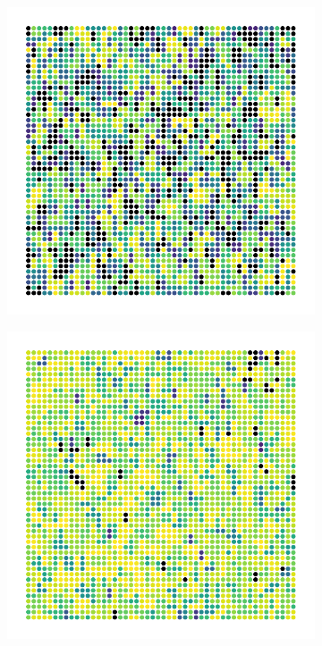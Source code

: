 \documentclass[twoside,10pt]{article}
\begin{document}
\begin{figure}[H]
        \centering
        \begin{subfigure}
                \centering
                \includegraphics[scale=0.45]{fig/exp-precrit.pdf}
        \end{subfigure}
        \begin{subfigure}
                \centering
                \includegraphics[scale=0.45]{fig/exp-crit.pdf}

\end{subfigure}
\end{figure}
\end{document}
